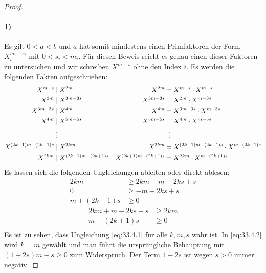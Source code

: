 \begin{proof}
  \paragraph{1)}
  Es gilt $0 < a < b$ und $a$ hat somit mindestens einen Primfaktoren
  der Form $X_i^{m_i - s_i}$ mit $0 < s_i < m_i$.
  Für diesen Beweis reicht es genau einen dieser Faktoren zu untersuchen und wir schreiben
  $X^{m - s}$ ohne den Index $i$. Es werden die folgenden Fakten aufgeschrieben:
  \begin{align*}
    X^{m - s}                & \mid X^{2m}                    & X^{2m}                    & = X^{m - s} \cdot X^{m + s}                       \\
    X^{2m}                   & \mid X^{3m - 3s}               & X^{3m - 3s}               & = X^{2m} \cdot X^{m - 3s}                         \\
    X^{3m - 3s}              & \mid X^{4m}                    & X^{4m}                    & = X^{3m - 3s} \cdot X^{m + 3s}                    \\
    X^{4m}                   & \mid X^{5m - 5s}               & X^{5m - 5s}               & = X^{4m} \cdot X^{m - 5s}                         \\
                             & \vdotswithin{\mid}             &                           & \vdotswithin{=}                                   \\
    X^{(2k - 1)m - (2k -1)s} & \mid X^{2km}                   & X^{2km}                   & = X^{(2k - 1)m - (2k -1)s} \cdot X^{m + (2k -1)s} \\
    X^{2km}                  & \mid X^{(2k + 1)m - (2k + 1)s} & X^{(2k + 1)m - (2k + 1)s} & = X^{2km} \cdot X^{m - (2k + 1)s}
  \end{align*}
  Es lassen sich die folgenden Ungleichungen ableiten oder direkt ablesen:
  \begin{equation}
    \label{eq:33.4.1}
    \begin{aligned}
      2km           & \geq 2km - m - 2ks + s \\
      0             & \geq -m - 2ks + s      \\
      m + (2k - 1)s & \geq 0
    \end{aligned}
  \end{equation}
  \begin{equation}
    \label{eq:33.4.2}
    \begin{aligned}
      2km + m - 2ks - s & \geq 2km \\
      m - (2k + 1)s     & \geq 0   \\
    \end{aligned}
  \end{equation}
  \noindent
  Es ist zu sehen, dass Ungleichung \ref{eq:33.4.1} für alle $k,m,s$ wahr ist. In \ref{eq:33.4.2}
  wird $k = m$ gewählt und man führt die ursprüngliche Behauptung mit $(1 - 2s)m -s \geq 0$ zum Widerspruch.
  Der Term $1 - 2s$ ist wegen $s > 0$ immer negativ.


\end{proof}
